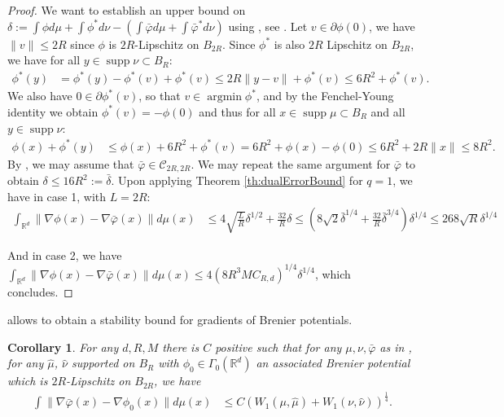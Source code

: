 \documentclass[11pt]{article}
\newtheorem{corollary}[lemma]{Corollary}
\DeclareMathOperator{\argmin}{argmin}
\DeclareMathOperator{\supp}{supp}
\newcommand{\R}{\mathbb R}
\newcommand{\1}{\mathbbm{1}}
\numberwithin{equation}{section}
\begin{document}
\begin{proof}
    We want to establish an upper bound on $\delta:=\int\phi d\mu+\int \phi^*d\nu-\left( \int \bar{\varphi}d\mu+\int \bar{\varphi}^*d\nu \right)$ using , see .
    Let  $v\in\partial\phi(0)$, we have $\|v\|\leq 2R$ since $\phi$ is $2R$-Lipschitz on $B_{2R}$. Since $\phi^*$ is also $2R$ Lipschitz on $B_{2R}$, we have for all $y\in \supp \nu \subset B_R$:
    \begin{align*}
            \phi^*(y)&=\phi^*(y)-\phi^*(v)+\phi^*(v) \leq2R\|y-v\|+\phi^*(v) \leq 6R^2+\phi^*(v).
    \end{align*}
    We also have $0\in\partial\phi^*(v)$, so that $v \in \argmin \phi^*$, and by the Fenchel-Young identity we obtain $\phi^*(v)=-\phi(0)$ and thus for all $x\in \supp \mu \subset B_R$ and all $y\in \supp \nu$:
    \begin{align*}
            \phi(x)+\phi^*(y)&\leq\phi(x)+ 6R^2+\phi^*(v)
            =6R^2+\phi(x)-\phi(0)
            \leq 6R^2+2R\|x\|
            \leq 8R^2.
    \end{align*}
    By , we may assume that $\bar{\varphi} \in \mathcal{C}_{2R,2R}$. We may repeat the same argument for $\bar{\varphi}$ to obtain $\delta\leq 16R^2:=\bar{\delta}$. Upon applying Theorem \ref{th:dualErrorBound} for $q=1$, we have in case 1, with $L=2R$:
    \begin{align*}
            \int_{\R^d}\|\nabla \phi(x)-\nabla\bar{\varphi}(x)\|d\mu(x)&\leq4\sqrt{\frac{L}{R}}\delta^{1/2}+\frac{32}{R}\delta
            \leq \left(8\sqrt{2}\bar{\delta}^{1/4}+\frac{32}{R}\bar{\delta}^{3/4}\right)\delta^{1/4}
            \leq 268\sqrt{R}\delta^{1/4}
    \end{align*}
 
    And in case 2, we have $\int_{\R^d}\|\nabla \phi(x)-\nabla\bar{\varphi}(x)\|d\mu(x)\leq 4(8R^3MC_{R,d})^{1/4}\delta^{1/4}$, which concludes.
\end{proof}
 allows to obtain a stability bound for gradients of Brenier potentials.
\begin{corollary}
For any $d,R,M$ there is $C$ positive such that for any $\mu,\nu,\bar{\varphi}$ as in , for any $\hat{\mu}$, $\hat{\nu}$ supported on $B_R$ with $\phi_0 \in \Gamma_0(\R^d)$ an associated  Brenier potential which is $2R$-Lipschitz on $B_{2R}$, we have
    \begin{align*}
       \int \| \nabla \bar{\varphi}(x) - \nabla \phi_0(x)\| d\mu(x) &\leq C\left(W_1(\mu,\hat{\mu}) + W_1 (\nu, \hat{\nu})\right)^{\frac{1}{4}}. 
    \end{align*}    
    \label{cor:simplerForm2}
\end{corollary}
\end{document}
